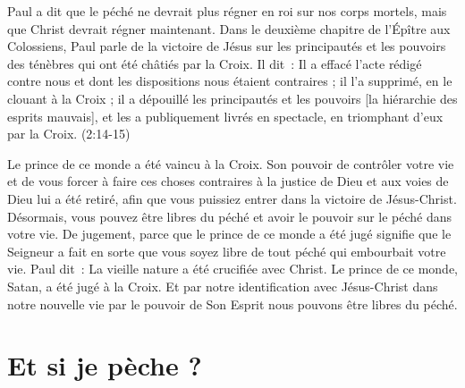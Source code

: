 Paul a dit que le péché ne devrait plus régner en roi sur nos corps mortels,
 mais que Christ devrait régner maintenant.
 Dans le deuxième chapitre de l'Épître aux Colossiens,
 Paul parle de la victoire de Jésus sur les principautés et les pouvoirs
 des ténèbres qui ont été châtiés par la Croix. Il dit~:
 \og Il a effacé l'acte rédigé contre nous et dont les dispositions
 nous étaient contraires ; il l'a supprimé, en le clouant à la Croix ;
 il a dépouillé les principautés et les pouvoirs
 [la hiérarchie des esprits mauvais],
 et les a publiquement livrés en spectacle, en triomphant d'eux
 par la Croix.  \fg{} (2:14-15)

Le prince de ce monde a été vaincu à la Croix.
 Son pouvoir de contrôler votre vie et de vous forcer à faire ces choses
 contraires à la justice de Dieu et aux voies de Dieu lui a été retiré,
 afin que vous puissiez entrer dans la victoire de Jésus-Christ.
 Désormais, vous pouvez être libres du péché et avoir le pouvoir
 sur le péché dans votre vie.
 \og De jugement, parce que le prince de ce monde a été jugé \fg{}
 signifie que le Seigneur a fait en sorte que vous soyez libre de tout péché
 qui embourbait votre vie. Paul dit~:
 \og La vieille nature a été crucifiée avec Christ. \fg{}
 Le prince de ce monde, Satan, a été jugé à la Croix.
 Et par notre identification avec Jésus-Christ dans notre nouvelle vie
 \ocadr par le pouvoir de Son Esprit \fcadr{}
 nous pouvons être libres du péché.


\section*{Et si je pèche ?}

